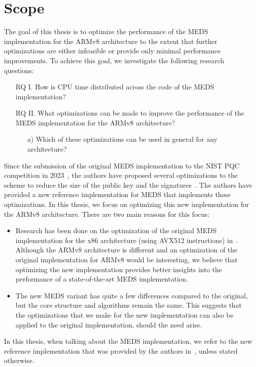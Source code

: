 \documentclass[11pt,a4paper]{report}
\theoremstyle{definition}
\begin{document}
\section{Scope}
The goal of this thesis is to optimize the performance of the MEDS implementation for the ARMv8 architecture to the extent that further optimizations are either infeasible or provide only minimal performance improvements. To achieve this goal, we investigate the following research questions:
\begin{itemize}[left=35pt,labelsep=15pt]
  \item[RQ I.] How is CPU time distributed across the code of the MEDS implementation?
  \item[RQ II.] What optimizations can be made to improve the performance of the MEDS implementation for the ARMv8 architecture?
        \begin{itemize}
          \item[a)] Which of these optimizations can be used in general for any
                architecture?
        \end{itemize}
\end{itemize}

Since the submission of the original MEDS implementation to the NIST PQC competition in 2023~\cite{chou2023meds}, the authors have proposed several optimizations to the scheme to reduce the size of the public key and the signatures~\cite{chou2024reducing}. The authors have provided a new reference implementation for MEDS that implements these optimizations. In this thesis, we focus on optimizing this new implementation for the ARMv8 architecture. There are two main reasons for this focus:
\begin{itemize}
  \item Research has been done on the optimization of the original MEDS implementation for the x86 architecture (using AVX512 instructions) in~\cite{IIS2023HighLevel, IIS2023LowLevel}. Although the ARMv8 architecture is different and an optimization of the original implementation for ARMv8 would be interesting, we believe that optimizing the new implementation provides better insights into the performance of a state-of-the-art MEDS implementation.
  \item The new MEDS variant has quite a few differences compared to the original, but the core structure and algorithms remain the same. This suggests that the optimizations that we make for the new implementation can also be applied to the original implementation, should the need arise.
\end{itemize}
In this thesis, when talking about the MEDS implementation, we refer to the new reference implementation that was provided by the authors in~\cite{chou2024reducing}, unless stated otherwise.
\end{document}

